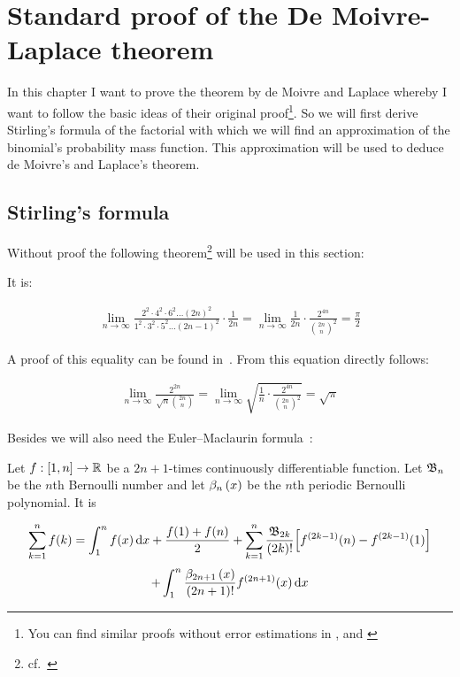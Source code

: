 \chapter{Standard proof of the De Moivre-Laplace theorem}

In this chapter I want to prove the theorem by de Moivre and Laplace whereby I want to follow the basic ideas of their original proof\footnote{You can find similar proofs without error estimations in \cite[pp. 64-67]{irle}, \cite[pp. 131-134]{georgii} and \cite{wiki:demoivrelaplace}}. So we will first derive Stirling's formula of the factorial with which we will find an approximation of the binomial's probability mass function. This approximation will be used to deduce de Moivre's and Laplace's theorem.

\section{Stirling's formula}

Without proof the following theorem\footnote{cf.~\cite[pp. 505, 63]{heuser}} will be used in this section:

\begin{theorem}
  It is:

  \begin{align}
    \lim_{n\to\infty} \frac{2^2\cdot4^2\cdot6^2\dots(2n)^2}{1^2\cdot3^2\cdot5^2\dots(2n-1)^2}\cdot \frac{1}{2n} = \lim_{n\to\infty} \frac{1}{2n} \cdot \frac{2^{4n}}{\binom{2n}{n}^2} = \frac{\pi}{2}
  \end{align}
\end{theorem}

\noindent A proof of this equality can be found in~\cite[pp. 504-505]{heuser}. From this equation directly follows:

\begin{align} \label{wallis}
  \lim_{n\to\infty} \frac{2^{2n}}{\sqrt n \binom{2n}{n}} = \lim_{n\to\infty} \sqrt{\frac 1n \cdot \frac{2^{4n}}{\binom{2n}{n}^2}} = \sqrt \pi
\end{align}

\noindent Besides we will also need the Euler–Maclaurin formula~\cite[p. 226]{koenigsberger}:

\begin{theorem}
  Let $f:[1,n]\to\mathbb R$ be a $2n+1$-times continuously differentiable function. Let $\mathfrak{B}_{n}$ be the $n$th Bernoulli number and let $\beta_{n}\left({x}\right)$ be the $n$th periodic Bernoulli polynomial. It is

  \begin{multline} \label{euler-maclaurin-formula}
    \sum_{k=1}^n f(k) = \int_1^n f(x)\d{x} + \frac{f(1)+f(n)}{2} + \sum_{k=1}^n \frac{\bn[2k]}{(2k)!} \Big[f^{(2k-1)}(n) - f^{(2k-1)}(1)\Big] \nl
     + \int_1^n \frac{\bp[2n+1]{x}}{(2n+1)!} f^{(2n+1)}(x) \d{x}
  \end{multline}
\end{theorem}


